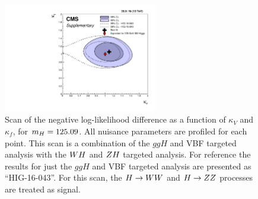 \begin{figure}[!ht]
 \begin{center}
  \includegraphics[width=0.60\textwidth]{higgs_to_taus_vh/plots/combined/kFkV_HIG-18-007_plus_HIG-16-043_comp.pdf}
 \end{center}
 \caption{Scan of the negative 
 log-likelihood difference as a function of $\kappa_V$ and $\kappa_f$, for 
 $m_{H} = 125.09$\GeV.  All nuisance parameters are profiled for each point. 
 This scan is a combination of the $ggH$ and VBF targeted analysis with the 
 $WH$ and $ZH$ targeted analysis. For reference the results for just
 the $ggH$ and VBF targeted analysis are presented as ``HIG-16-043''.
 For this scan, the $H\to WW$ and $H\to ZZ$ processes 
 are treated as signal.
 }
 \label{fig:cmb_kFkV}
\end{figure}



\clearpage
